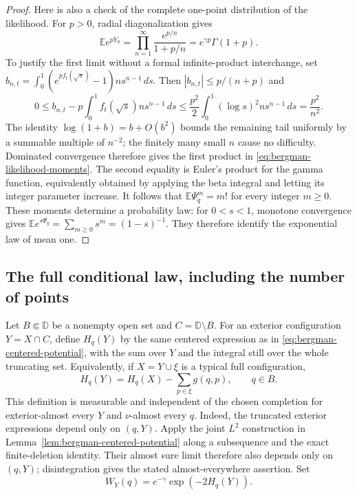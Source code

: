 \documentclass[11pt,a4paper]{article}
\numberwithin{equation}{section}
\theoremstyle{definition}
\theoremstyle{remark}
\newcommand{\D}{\mathbb D}
\newcommand{\E}{\mathbb E}
\begin{document}
\begin{proof}
Here is also a check of the complete one-point distribution of the
likelihood.  For $p>0$, radial diagonalization gives
\begin{equation}
 \E e^{pY_0}
 =\prod_{n=1}^{\infty}\frac{e^{p/n}}{1+p/n}
 = e^{\gamma p}\Gamma(1+p).
 \label{eq:bergman-likelihood-moments}
\end{equation}
To justify the first limit without a formal infinite-product
interchange, set $b_{n,t}=\int_0^1(e^{pf_t(\sqrt s)}-1)n s^{n-1}\,ds$.
Then $|b_{n,t}|\leq p/(n+p)$ and
\[
 0\leq b_{n,t}-p\int_0^1f_t(\sqrt s)n s^{n-1}\,ds
 \leq\frac{p^2}{2}\int_0^1(\log s)^2n s^{n-1}\,ds
 =\frac{p^2}{n^2}.
\]
The identity $\log(1+b)=b+O(b^2)$ bounds the remaining tail uniformly
by a summable multiple of $n^{-2}$; the finitely many small $n$ cause
no difficulty.  Dominated convergence therefore gives the first
product in \eqref{eq:bergman-likelihood-moments}.  The second equality
is Euler's product for the gamma function, equivalently obtained by
applying the beta integral and letting its integer parameter increase.
It follows that $\E\Psi_q^m=m!$ for every integer $m\geq0$.  These
moments determine a probability law: for $0<s<1$, monotone convergence
gives $\E e^{s\Psi_q}=\sum_{m\geq0}s^m=(1-s)^{-1}$.
They therefore identify the exponential law of mean one.
\end{proof}

\subsection{The full conditional law, including the number of points}

Let $B\Subset\D$ be a nonempty open set and $C=\D\setminus B$.
For an exterior configuration $Y=X\cap C$, define $H_q(Y)$ by the same
centered expression as in \eqref{eq:bergman-centered-potential}, with
the sum over $Y$ and the integral still over the whole truncating set.
Equivalently, if $X=Y\cup\xi$ is a typical full configuration,
\[
 H_q(Y)=H_q(X)-\sum_{p\in\xi}g(q,p),\qquad q\in B.
\]
This definition is measurable and independent of the chosen completion
for exterior-almost every $Y$ and $\nu$-almost every $q$.  Indeed, the
truncated exterior expressions depend only on $(q,Y)$.  Apply the joint
$L^2$ construction in Lemma~\ref{lem:bergman-centered-potential}
along a subsequence and the exact finite-deletion identity.  Their
almost sure limit therefore also depends only on $(q,Y)$; disintegration
gives the stated almost-everywhere assertion.  Set
\[
 W_Y(q)=e^{-\gamma}\exp(-2H_q(Y)).
\]
\end{document}
